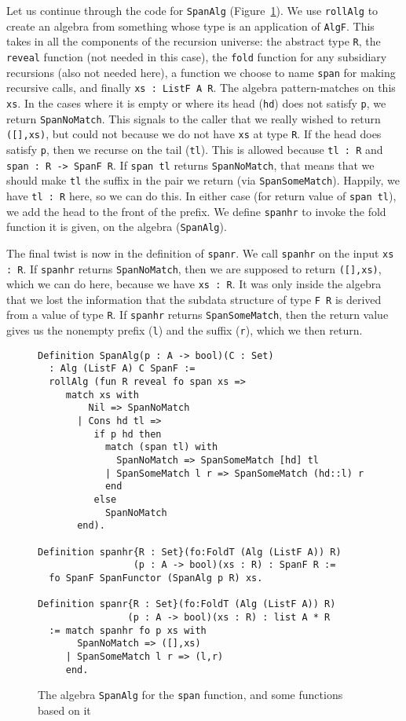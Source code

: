 \documentclass[a4paper,USenglish]{lipics-v2021}
\begin{document}
Let us continue through the code for \verb|SpanAlg|
(Figure~\ref{fig:span}).  We use \verb|rollAlg| to create an algebra
from something whose type is an application of \verb|AlgF|.  This
takes in all the components of the recursion universe: the abstract
type \verb|R|, the \verb|reveal| function (not needed in this case),
the \verb|fold| function for any subsidiary recursions (also not
needed here), a function we choose to name \verb|span| for making
recursive calls, and finally \verb|xs : ListF A R|.  The algebra
pattern-matches on this \verb|xs|.  In the cases where it is empty or
where its head (\verb|hd|) does not satisfy \verb|p|, we return
\verb|SpanNoMatch|.  This signals to the caller that we really wished
to return \verb|([],xs)|, but could not because we do not have
\verb|xs| at type \verb|R|.  If the head does satisfy \verb|p|, then
we recurse on the tail (\verb|tl|).  This is allowed because
\verb|tl : R| and \verb|span : R -> SpanF R|.  If \verb|span tl|
returns \verb|SpanNoMatch|, that means that we should make \verb|tl|
the suffix in the pair we return (via \verb|SpanSomeMatch|).  Happily,
we have \verb|tl : R| here, so we can do this.  In either case (for
return value of \verb|span tl|), we add the head to the front of the
prefix.  We define \verb|spanhr| to invoke the fold function it is
given, on the algebra (\verb|SpanAlg|).

The final twist is now in the definition of \verb|spanr|.  We call
\verb|spanhr| on the input \verb|xs : R|.  If \verb|spanhr| returns
\verb|SpanNoMatch|, then we are supposed to return \verb|([],xs)|,
which we can do here, because we have \verb|xs : R|.  It was only
inside the algebra that we lost the information that the subdata
structure of type \verb|F R| is derived from a value of type \verb|R|.
If \verb|spanhr| returns \verb|SpanSomeMatch|, then the return value
gives us the nonempty prefix (\verb|l|) and the suffix (\verb|r|), which we then return.

\begin{figure}
\begin{verbatim}
Definition SpanAlg(p : A -> bool)(C : Set)
  : Alg (ListF A) C SpanF :=
  rollAlg (fun R reveal fo span xs => 
     match xs with
         Nil => SpanNoMatch 
       | Cons hd tl =>
          if p hd then
            match (span tl) with
              SpanNoMatch => SpanSomeMatch [hd] tl
            | SpanSomeMatch l r => SpanSomeMatch (hd::l) r
            end
          else
            SpanNoMatch 
       end).

Definition spanhr{R : Set}(fo:FoldT (Alg (ListF A)) R)
                 (p : A -> bool)(xs : R) : SpanF R :=
  fo SpanF SpanFunctor (SpanAlg p R) xs.

Definition spanr{R : Set}(fo:FoldT (Alg (ListF A)) R)
                (p : A -> bool)(xs : R) : list A * R
  := match spanhr fo p xs with
       SpanNoMatch => ([],xs)
     | SpanSomeMatch l r => (l,r)
     end.
\end{verbatim}
\caption{The algebra \texttt{SpanAlg} for the \texttt{span} function, and some functions based on it}
\label{fig:span}
\end{figure}
\end{document}
